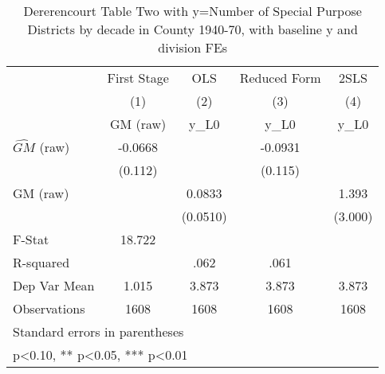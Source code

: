 \begin{table}[htbp]\centering
\def\sym#1{\ifmmode^{#1}\else\(^{#1}\)\fi}
\caption{Dererencourt Table Two with y=Number of Special Purpose Districts by decade in County 1940-70, with baseline y and division FEs}
\begin{tabular}{l*{4}{c}}
\toprule
                    & First Stage   &         OLS   &Reduced Form   &        2SLS   \\
                    &\multicolumn{1}{c}{(1)}&\multicolumn{1}{c}{(2)}&\multicolumn{1}{c}{(3)}&\multicolumn{1}{c}{(4)}\\
                    &\multicolumn{1}{c}{GM  (raw)}&\multicolumn{1}{c}{y\_L0}&\multicolumn{1}{c}{y\_L0}&\multicolumn{1}{c}{y\_L0}\\
\midrule
$\hat{GM}$ (raw)    &     -0.0668   &               &     -0.0931   &               \\
                    &     (0.112)   &               &     (0.115)   &               \\
\addlinespace
GM  (raw)           &               &      0.0833   &               &       1.393   \\
                    &               &    (0.0510)   &               &     (3.000)   \\
\midrule
F-Stat              &      18.722   &               &               &               \\
R-squared           &               &        .062   &        .061   &               \\
Dep Var Mean        &       1.015   &       3.873   &       3.873   &       3.873   \\
Observations        &        1608   &        1608   &        1608   &        1608   \\
\bottomrule
\multicolumn{5}{l}{\footnotesize Standard errors in parentheses}\\
\multicolumn{5}{l}{\footnotesize * p<0.10, ** p<0.05, *** p<0.01}\\
\end{tabular}
\end{table}
